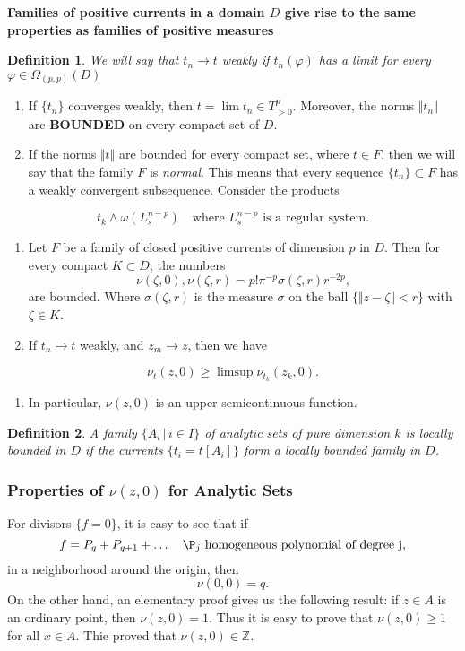\documentclass[12pt,twoside,a4paper]{report}
\newtheorem{definition}{Definition}[section]
\newcommand{\om}{\ensuremath{\Omega}}
\begin{document}
\textbf{Families of positive currents in a domain $D$ give rise to the same properties as families of positive measures}

\begin{definition}
We will say that $t_n\rightarrow t$ \emph{weakly} if $t_n(\varphi)$ has a limit for every $\varphi\in\om_{(p,p)}(D)$
\end{definition}

\begin{enumerate}
\item If $\{t_n\}$ converges weakly, then $t=\lim t_n\in T^p_{>0}$. Moreover, the norms $\Vert t_n\Vert$ are \textbf{BOUNDED} on every compact set of $D$.
\item If the norms $\Vert t\Vert$ are bounded for every compact set, where $t\in F$, then we will say that the family $F$ is \emph{normal}. This means that every sequence $\{t_n\}\subset F$ has a weakly convergent subsequence.
Consider the products
\end{enumerate}
\[
    t_k\wedge\omega(L^{n-p}_s)\quad\text{where }L^{n-p}_s\text{ is a regular system}.
\]
\begin{enumerate}
\item Let $F$ be a family of closed positive currents of dimension $p$ in $D$. Then for every compact $K\subset D$, the numbers
\[
        \nu(\zeta,0),\nu(\zeta,r)=p!\pi^{-p}\sigma(\zeta,r)r^{-2p},
   \]
\noindent are bounded. Where $\sigma(\zeta,r)$ is the measure $\sigma$ on the ball $\{\Vert z-\zeta\Vert<r\}$ with $\zeta\in K$.
\item If $t_n\rightarrow t$ weakly, and $z_m\rightarrow z$, then we have
\end{enumerate}
\begin{equation}
        \nu_t(z,0)\geq\limsup\nu_{t_k}(z_k,0).
\end{equation}
\begin{enumerate}
\item In particular, $\nu(z,0)$ is an upper semicontinuous function.
\end{enumerate}

\begin{definition}
A family $\{A_i\,|\,i\in I\}$ of analytic sets of pure dimension $k$ is locally bounded in $D$ if the currents $\{t_i=t[A_i]\}$ form a locally bounded family in $D$.
\end{definition}

\subsubsection{Properties of $\nu(z,0)$ for Analytic Sets}
\label{sec:org81bac70}
For divisors $\{f=0\}$, it is easy to see that if
\[
    f=P_q+P_{q+1}+\dots\quad\P_j\text{ homogeneous polynomial of degree j},
\]
\noindent in a neighborhood around the origin, then
\[
    \nu(0,0)=q.
\]
On the other hand, an elementary proof gives us the following result: if $z\in A$ is an ordinary point, then $\nu(z,0)=1$. Thus it is easy to prove that $\nu(z,0)\geq1$ for all $x\in A$. Thie proved that $\nu(z,0)\in\mathbb{Z}$.
\end{document}

